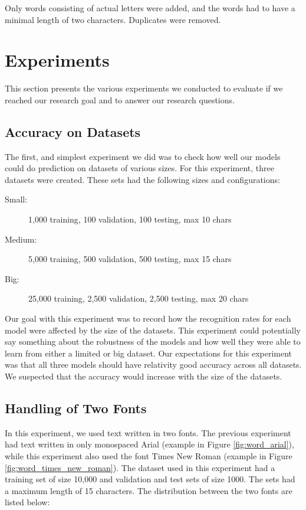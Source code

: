 Only words consisting of actual letters were added, and the words had to have a minimal length of two characters. Duplicates were removed.


\section{Experiments}
\label{sec:experiments_details}
This section presents the various experiments we conducted to evaluate if we reached our research goal and to answer our research questions.

\subsection{Accuracy on Datasets}
\label{sec:accuracy_on_datasets}
The first, and simplest experiment we did was to check how well our models could do prediction on datasets of various sizes. For this experiment, three datasets were created. These sets had the following sizes and configurations:

\begin{description}
    \item[Small:]{1,000 training, 100 validation, 100 testing, max 10 chars}
    \item[Medium:]{5,000 training, 500 validation, 500 testing, max 15 chars}
    \item[Big:]{25,000 training, 2,500 validation, 2,500 testing, max 20 chars}
\end{description}

Our goal with this experiment was to record how the recognition rates for each model were affected by the size of the datasets. This experiment could potentially say something about the robustness of the models and how well they were able to learn from either a limited or big dataset. Our expectations for this experiment was that all three models should have relativity good accuracy across all datasets. We suspected that the accuracy would increase with the size of the datasets.

\subsection{Handling of Two Fonts}
In this experiment, we used text written in two fonts. The previous experiment had text written in only monospaced Arial (example in Figure \ref{fig:word_arial}), while this experiment also used the font Times New Roman (example in Figure \ref{fig:word_times_new_roman}). The dataset used in this experiment had a training set of size 10,000 and validation and test sets of size 1000. The sets had a maximum length of 15 characters. The distribution between the two fonts are listed below:

